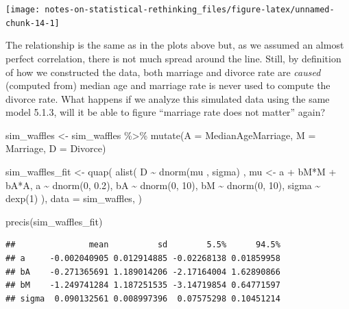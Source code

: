 \documentclass[
]{book}
\newenvironment{Shaded}{\begin{snugshade}}{\end{snugshade}}
\newcommand{\AttributeTok}[1]{\textcolor[rgb]{0.77,0.63,0.00}{#1}}
\newcommand{\DecValTok}[1]{\textcolor[rgb]{0.00,0.00,0.81}{#1}}
\newcommand{\FloatTok}[1]{\textcolor[rgb]{0.00,0.00,0.81}{#1}}
\newcommand{\FunctionTok}[1]{\textcolor[rgb]{0.00,0.00,0.00}{#1}}
\newcommand{\NormalTok}[1]{#1}
\newcommand{\OtherTok}[1]{\textcolor[rgb]{0.56,0.35,0.01}{#1}}
\newcommand{\SpecialCharTok}[1]{\textcolor[rgb]{0.00,0.00,0.00}{#1}}
\begin{document}
\begin{center}\texttt{[image: notes-on-statistical-rethinking\_files/figure-latex/unnamed-chunk-14-1]} \end{center}

The relationship is the same as in the plots above but, as we assumed an almost perfect correlation, there is not much spread around the line. Still, by definition of how we constructed the data, both marriage and divorce rate are \emph{caused} (computed from) median age and marriage rate is never used to compute the divorce rate. What happens if we analyze this simulated data using the same model 5.1.3, will it be able to figure ``marriage rate does not matter'' again?

\begin{Shaded}
\begin{Highlighting}[]
\NormalTok{sim\_waffles }\OtherTok{\textless{}{-}}
\NormalTok{  sim\_waffles }\SpecialCharTok{\%\textgreater{}\%}
  \FunctionTok{mutate}\NormalTok{(}\AttributeTok{A =}\NormalTok{ MedianAgeMarriage,}
         \AttributeTok{M =}\NormalTok{ Marriage,}
         \AttributeTok{D =}\NormalTok{ Divorce)}

\NormalTok{sim\_waffles\_fit }\OtherTok{\textless{}{-}} \FunctionTok{quap}\NormalTok{(}
  \FunctionTok{alist}\NormalTok{(}
\NormalTok{    D }\SpecialCharTok{\textasciitilde{}} \FunctionTok{dnorm}\NormalTok{(mu , sigma) ,}
\NormalTok{    mu }\OtherTok{\textless{}{-}}\NormalTok{ a }\SpecialCharTok{+}\NormalTok{ bM}\SpecialCharTok{*}\NormalTok{M }\SpecialCharTok{+}\NormalTok{ bA}\SpecialCharTok{*}\NormalTok{A,}
\NormalTok{    a }\SpecialCharTok{\textasciitilde{}} \FunctionTok{dnorm}\NormalTok{(}\DecValTok{0}\NormalTok{, }\FloatTok{0.2}\NormalTok{),}
\NormalTok{    bA }\SpecialCharTok{\textasciitilde{}} \FunctionTok{dnorm}\NormalTok{(}\DecValTok{0}\NormalTok{, }\DecValTok{10}\NormalTok{),}
\NormalTok{    bM }\SpecialCharTok{\textasciitilde{}} \FunctionTok{dnorm}\NormalTok{(}\DecValTok{0}\NormalTok{, }\DecValTok{10}\NormalTok{),}
\NormalTok{    sigma }\SpecialCharTok{\textasciitilde{}} \FunctionTok{dexp}\NormalTok{(}\DecValTok{1}\NormalTok{)}
\NormalTok{  ), }
  \AttributeTok{data =}\NormalTok{ sim\_waffles,}
\NormalTok{)}

\FunctionTok{precis}\NormalTok{(sim\_waffles\_fit)}
\end{Highlighting}
\end{Shaded}

\begin{verbatim}
##               mean          sd        5.5%      94.5%
## a     -0.002040905 0.012914885 -0.02268138 0.01859958
## bA    -0.271365691 1.189014206 -2.17164004 1.62890866
## bM    -1.249741284 1.187251535 -3.14719854 0.64771597
## sigma  0.090132561 0.008997396  0.07575298 0.10451214
\end{verbatim}
\end{document}
